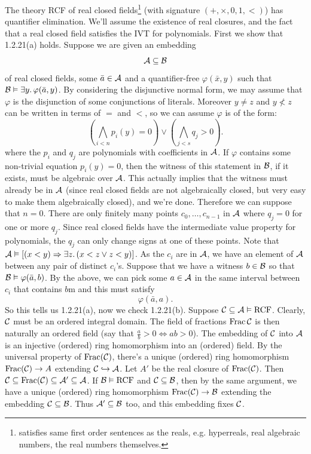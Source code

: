 \documentclass{article}
\numberwithin{thm}{subsection}
\begin{document}
\begin{ex}
    The theory RCF of real closed fields\footnote{satisfies same first order sentences as the reals, e.g. hyperreals, real algebraic numbers, the real numbers themselves.} (with signature $(+,\times, 0, 1, <)$) has quantifier elimination.
    \proof We'll assume the existence of real closures, and the fact that a real closed field satisfies the IVT for polynomials. 
    \gap First we show that 1.2.21(a) holds. Suppose we are given an embedding \[ \mathcal{A} \subseteq \mathcal{B} \] of real closed fields, some $\bar a \in \mathcal{A}$ and a quantifier-free $\varphi(\bar x, y)$ such that $\mathcal{B} \vDash \exists y. \, \varphi(\bar a, y)$. 
    \gap By considering the disjunctive normal form, we may assume that $\varphi$ is the disjunction of some conjunctions of literals. Moreover $y \neq z$ and $y \nless z$ can be written in terms of $=$ and $<$, so we can assume $\varphi$ is of the form: \[ \left( \bigwedge_{i < n} p_{i}(y)=0 \right) \vee \left( \bigwedge_{j<s} q_{j}>0 \right). \] where the $p_{i}$ and $q_{j}$ are polynomials with coefficients in $\mathcal{A}$. 
    \gap If $\varphi$ contains some non-trivial equation $p_{i}(y)=0$, then the witness of this statement in $\mathcal{B}$, if it exists, must be algebraic over $\mathcal{A}$. This actually implies that the witness must already be in $\mathcal{A}$ (since real closed fields are not algebraically closed, but very easy to make them algebraically closed), and we're done. Therefore we can suppose that $n=0$. 
    \gap There are only finitely many points $c_{0}, \dots, c_{n-1}$ in $\mathcal{A}$ where $q_{j}=0$ for one or more $q_{j}$. Since real closed fields have the intermediate value property for polynomials, the $q_{j}$ can only change signs at one of these points. 
    \gap Note that $\mathcal{A} \vDash \left[ (x < y) \Rightarrow \exists z. \, (x<z \vee z<y) \right]$. As the $c_{i}$ are in $\mathcal{A}$, we have an element of $\mathcal{A}$ between any pair of distinct $c_{i}$'s. 
    \gap Suppose that we have a witness $b \in \mathcal{B}$ so that $\mathcal{B} \vDash \varphi( \bar a, b)$. By the above, we can pick some $a \in \mathcal{A}$ in the same interval between $c_{i}$ that contains $b$m and this must satisfy \[ \varphi(\bar a, a). \] So this tells us 1.2.21(a), now we check 1.2.21(b). Suppose $\mathcal{C} \subseteq \mathcal{A} \vDash \text{RCF}$. Clearly, $\mathcal{C}$ must be an ordered integral domain. The field of fractions $\operatorname{Frac}{\mathcal{C}}$ is then naturally an ordered field (say that $\frac{a}{b}>0 \Leftrightarrow ab>0$). 
    \gap The embedding of $\mathcal{C}$ into $\mathcal{A}$ is an injective (ordered) ring homomorphism into an (ordered) field. By the universal property of $\operatorname{Frac} (\mathcal{C})$, there's a unique (ordered) ring homomorphism $\operatorname{Frac}(\mathcal{C}) \to A$ extending $\mathcal{C} \hookrightarrow \mathcal{A}$. Let $A'$ be the real closure of $\operatorname{Frac}(\mathcal{C})$. Then $\mathcal{C} \subseteq \operatorname{Frac}( \mathcal{C}) \subseteq \mathcal{A}' \subseteq \mathcal{A}$. If $\mathcal{B} \vDash \text{RCF}$ and $\mathcal{C} \subseteq \mathcal{B}$, then by the same argument, we have a unique (ordered) ring homomorphism $\operatorname{Frac} (\mathcal{C}) \to \mathcal{B}$ extending the embedding $\mathcal{C} \subseteq \mathcal{B}$. Thus $\mathcal{A}' \subseteq \mathcal{B}$ too, and this embedding fixes $\mathcal{C}$.
\end{ex}
\end{document}
